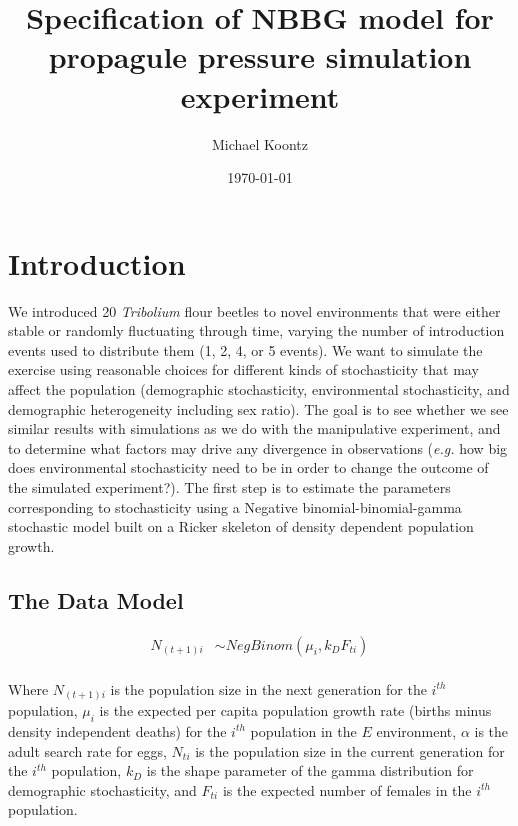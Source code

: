 \documentclass{article}[12pt]
\begin{document}
\title{Specification of NBBG model for propagule pressure simulation experiment}
\author{Michael Koontz} 
\date{\today}

\maketitle
\pagestyle {plain}

\vspace{-4em}

\section*{Introduction}

We introduced 20 \emph{Tribolium} flour beetles to novel environments that were either stable or randomly fluctuating through time, varying the number of introduction events used to distribute them (1, 2, 4, or 5 events). We want to simulate the exercise using reasonable choices for different kinds of stochasticity that may affect the population (demographic stochasticity, environmental stochasticity, and demographic heterogeneity including sex ratio). The goal is to see whether we see similar results with simulations as we do with the manipulative experiment, and to determine what factors may drive any divergence in observations (\emph{e.g.} how big does environmental stochasticity need to be in order to change the outcome of the simulated experiment?). The first step is to estimate the parameters corresponding to stochasticity using a Negative binomial-binomial-gamma stochastic model built on a Ricker skeleton of density dependent population growth.

\subsection*{The Data Model}

\begin{align*}
N_{(t+1)i} & \sim NegBinom(\mu_i, k_DF_{ti}) \\
\end{align*}

Where $N_{(t+1)i}$ is the population size in the next generation for the $i^{th}$ population, $\mu_i$ is the expected per capita population growth rate (births minus density independent deaths) for the $i^{th}$ population in the $E$ environment, $\alpha$ is the adult search rate for eggs, $N_{ti}$ is the population size in the current generation for the $i^{th}$ population, $k_D$ is the shape parameter of the gamma distribution for demographic stochasticity, and $F_{ti}$ is the expected number of females in the $i^{th}$ population.
\end{document}
